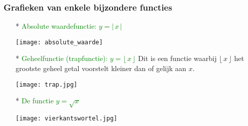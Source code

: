\hypertarget{bijzondere_functies}{}
\subsubsection{Grafieken van enkele bijzondere functies} \label{bijzondere_functies}

\begin{itemize}
\item[*] \textcolor{green}{\hypertarget{absolute_waardefunctie}{Absolute waardefunctie: $y=|\,x\,|$}} \label{absolute_waardefunctie}
  \begin{center}
  \texttt{[image: absolute\_waarde]}
  \end{center}
\item[*] \textcolor{green}{Geheelfunctie (\hypertarget{trapfunctie}{trapfunctie}): $y=\lfloor\,x\,\rfloor$} \label{trapfunctie}\newline
  Dit is een functie waarbij $\lfloor\,x\,\rfloor$ het grootste geheel getal voorstelt kleiner dan of gelijk aan $x$.
  \begin{center}
  \texttt{[image: trap.jpg]}
  \end{center}
\item[*] \textcolor{green}{De functie \hypertarget{vierkantswortel}{$y=\sqrt{x}$}} \label{vierkantswortel}
  \begin{center}
  \texttt{[image: vierkantswortel.jpg]}
  \end{center}
\end{itemize}


